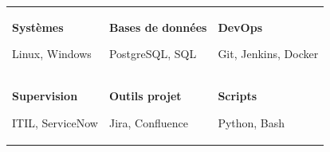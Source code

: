 \vspace{-4mm}


\begin{tabularx}{\textwidth}{@{}X X X@{}}

\begin{minipage}[t]{\linewidth}
\textbf{Systèmes}

Linux, Windows
\end{minipage}

&

\begin{minipage}[t]{\linewidth}
\textbf{Bases de données}

PostgreSQL, SQL
\end{minipage}

&

\begin{minipage}[t]{\linewidth}
\textbf{DevOps}

Git, Jenkins, Docker
\end{minipage}

\\[10mm]

\begin{minipage}[t]{\linewidth}
\textbf{Supervision}

ITIL, ServiceNow
\end{minipage}

&

\begin{minipage}[t]{\linewidth}
\textbf{Outils projet}

Jira, Confluence
\end{minipage}

&

\begin{minipage}[t]{\linewidth}
\textbf{Scripts}

Python, Bash
\end{minipage}


\end{tabularx}
